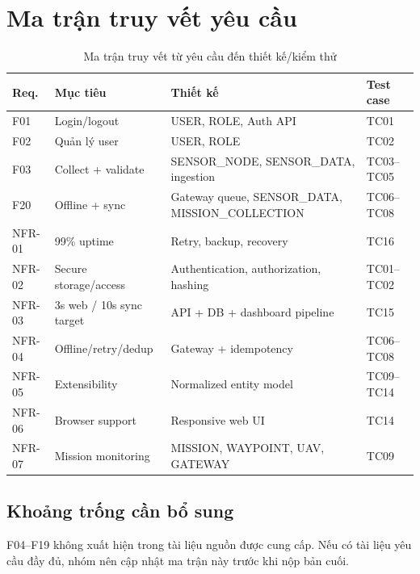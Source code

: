 
\chapter{Ma trận truy vết yêu cầu}
\label{app:trace}

\begin{longtable}{p{1.8cm}p{4.2cm}p{3.5cm}p{4cm}}
\caption{Ma trận truy vết từ yêu cầu đến thiết kế/kiểm thử}\label{tab:tracefull}\\
\toprule
Req. & Mục tiêu & Thiết kế & Test case \\
\midrule
F01 & Login/logout & USER, ROLE, Auth API & TC01\\
F02 & Quản lý user & USER, ROLE & TC02\\
F03 & Collect + validate & SENSOR\_NODE, SENSOR\_DATA, ingestion & TC03--TC05\\
F20 & Offline + sync & Gateway queue, SENSOR\_DATA, MISSION\_COLLECTION & TC06--TC08\\
NFR-01 & 99\% uptime & Retry, backup, recovery & TC16\\
NFR-02 & Secure storage/access & Authentication, authorization, hashing & TC01--TC02\\
NFR-03 & 3s web / 10s sync target & API + DB + dashboard pipeline & TC15\\
NFR-04 & Offline/retry/dedup & Gateway + idempotency & TC06--TC08\\
NFR-05 & Extensibility & Normalized entity model & TC09--TC14\\
NFR-06 & Browser support & Responsive web UI & TC14\\
NFR-07 & Mission monitoring & MISSION, WAYPOINT, UAV, GATEWAY & TC09\\
\bottomrule
\end{longtable}

\section{Khoảng trống cần bổ sung}
F04--F19 không xuất hiện trong tài liệu nguồn được cung cấp. Nếu có tài liệu yêu cầu đầy đủ, nhóm nên cập nhật ma trận này trước khi nộp bản cuối.
